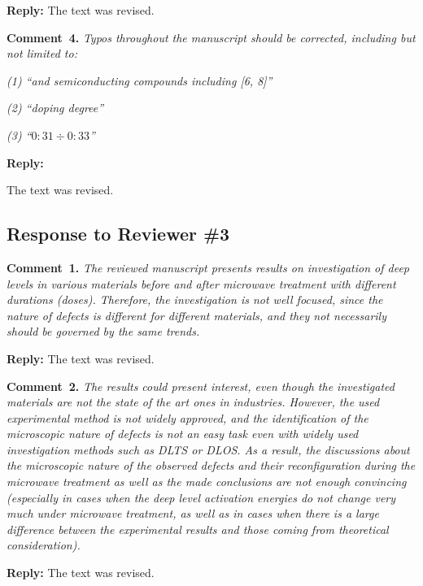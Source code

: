 \documentclass[10pt]{iopart}
\begin{document}
\noindent
\textcolor[rgb]{0.51,0.00,0.00}{\textbf{Reply:}}
The text was revised.


\vspace{1cm}
\noindent
\textcolor[rgb]{0.00,0.50,1.00}{\textbf{Comment~4.}}
\emph{Typos throughout the manuscript should be corrected, including but not limited to:}

\emph{(1) ``and semiconducting compounds including [6, 8]''}

\emph{(2) ``doping degree''}

\emph{(3) ``$0:31\div0:33$''}

\noindent
\textcolor[rgb]{0.51,0.00,0.00}{\textbf{Reply:}}

The text was revised.


\subsection*{Response to Reviewer \#3 }
\noindent
\textcolor[rgb]{0.00,0.50,1.00}{\textbf{Comment~1.}}
\emph{The reviewed manuscript presents results on investigation of deep levels
in various materials before and after microwave treatment with different durations (doses).
Therefore, the investigation is not well focused, since the nature of defects is different
for different materials, and they not necessarily should be governed by the same trends. }

\noindent
\textcolor[rgb]{0.51,0.00,0.00}{\textbf{Reply:}}
The text was revised.


\vspace{1cm}
\noindent
\textcolor[rgb]{0.00,0.50,1.00}{\textbf{Comment~2.}}
\emph{The results could present interest, even though the investigated materials are not the state of the art ones in industries.
However, the used experimental method is not widely approved,
and the identification of the microscopic nature of defects is not an easy
task even with widely used investigation methods such as DLTS or DLOS.
As a result, the discussions about the microscopic nature of the observed defects
and their reconfiguration during the microwave treatment
as well as the made conclusions are not enough convincing
(especially in cases when the deep level activation
energies do not change very much under microwave treatment,
as well as in cases when there is a large difference
between the experimental results and those coming from theoretical consideration).}

\noindent
\textcolor[rgb]{0.51,0.00,0.00}{\textbf{Reply:}}
The text was revised.
\end{document}
